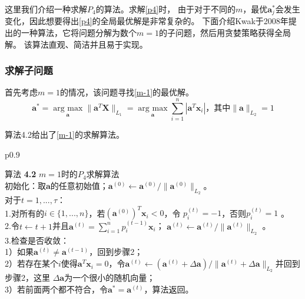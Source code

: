 这里我们介绍一种求解$P_4$的算法。求解\ref{p4}时，
由于对于不同的$m$，最优$\bm a_j^*$会发生变化，因此想要得出\ref{p4}的全局最优解是非常复杂的。
下面介绍Kwak于2008年提出的一种算法\cite{kwak2008principal}，它将问题分解为数个$m=1$的子问题，然后用贪婪策略获得全局解。
该算法直观、简洁并且易于实现。
\subsubsection{求解子问题}

首先考虑$m = 1$的情况，该问题寻找\eqref{m-1}的最优解。
\begin{equation}\label{m-1}
    \bm a^* = \underset{\bm a}{\operatorname{arg\ max}}\| \bm a ^T \bm{X}\|_{L_1}
    = \underset{\bm a}{\operatorname{arg\ max}}\sum_{i=1}^n|\bm a^T\bm x_i|
    \text{，其中}\|\bm a\|_{L_2} = 1
\end{equation}

算法4.2给出了\eqref{m-1}的求解算法。
\begin{table}[H]%
    \centering%
    \begin{tabular}{{p{0.9\columnwidth}}}%
    
    \toprule%
    {\heiti 算法} {\bf 4.2} $m=1$时的$P_4$求解算法\\
    \midrule%
        初始化：取$\bm a$的任意初始值；$\bm a^{(0)}\leftarrow \bm a^{(0)}/\|\bm a^{(0)}\|_{L_2}$。 \\
        对于$t = 1, ..., \tau$：\\
            1.对所有的$i \in \{1, ..., n\}$，若${(\bm a^{(0)})}^T\bm x_i < 0$，令
            $p_i^{(t)} = -1 $，否则$p_i^{(t)} = 1$ 。\\
            2.令$t \leftarrow t+1$并且$\bm a^{(t)} = \sum_{i=1}^np_i^{(t-1)}\bm x_i$；
            $\bm a^{(t)} \leftarrow \bm a^{(t)}/ \|\bm a^{(t)}\|_{L_2}$ 。\\
            3.检查是否收敛：\\
            1）如果$\bm a^{(t)} \neq \bm a^{(t-1)}$，回到步骤2；\\
            2）若存在某个$i$使得$\bm a^T\bm x_i = 0$，令$\bm a^{(t)} \leftarrow
            (\bm a^{(t)} + \Delta \bm a)/\|\bm a^{(t)} + \Delta \bm a\|_{L_2}$并回到步骤2，这里
            $\Delta \bm a$为一个很小的随机向量； \\
            3）若前面两个都不符合，令$\bm a^* = \bm a^{(t)}$，算法返回。\\
    \bottomrule%
    \end{tabular}
\end{table}%

